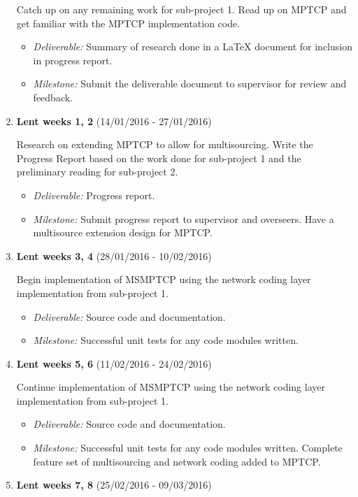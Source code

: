 \documentclass[12pt,a4paper,twoside]{article}
\begin{document}
\begin{enumerate}
Catch up on any remaining work for sub-project 1. 
Read up on MPTCP and get familiar with the MPTCP implementation code.
\begin{itemize}
  \item {\em Deliverable:} Summary of research done in a LaTeX document for inclusion in progress report.
  \item {\em Milestone:} Submit the deliverable document to supervisor for review and feedback.
\end{itemize}

\item {\bf Lent weeks 1, 2} (14/01/2016 - 27/01/2016)

Research on extending MPTCP to allow for multisourcing.
Write the Progress Report based on the work done for sub-project 1 and the preliminary reading for sub-project 2.
\begin{itemize}
  \item {\em Deliverable:} Progress report.
  \item {\em Milestone:} Submit progress report to supervisor and overseers. Have a multisource extension design for MPTCP.
\end{itemize}

\item {\bf Lent weeks 3, 4} (28/01/2016 - 10/02/2016)

Begin implementation of MSMPTCP using the network coding layer implementation from sub-project 1.
\begin{itemize}
  \item {\em Deliverable:} Source code and documentation.
  \item {\em Milestone:} Successful unit tests for any code modules written.
\end{itemize}

\item {\bf Lent weeks 5, 6} (11/02/2016 - 24/02/2016)

Continue implementation of MSMPTCP using the network coding layer implementation from sub-project 1.
\begin{itemize}
  \item {\em Deliverable:} Source code and documentation.
  \item {\em Milestone:} Successful unit tests for any code modules written. Complete feature set of multisourcing and network coding added to MPTCP.
\end{itemize}

\item {\bf Lent weeks 7, 8} (25/02/2016 - 09/03/2016)


\end{enumerate}
\end{document}
